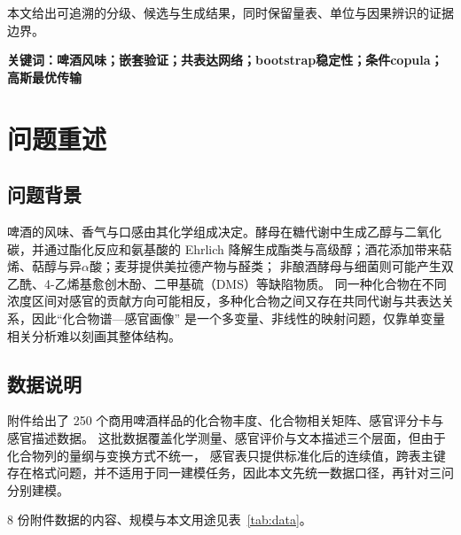 \documentclass[UTF8,a4paper,zihao=-4]{ctexart}
\numberwithin{figure}{section}
\numberwithin{table}{section}
\numberwithin{equation}{section}
\begin{document}
本文给出可追溯的分级、候选与生成结果，同时保留量表、单位与因果辨识的证据边界。

\vspace{0.3em}
\noindent\textbf{关键词：啤酒风味；嵌套验证；共表达网络；bootstrap稳定性；条件copula；高斯最优传输}
\newpage
\pagestyle{empty}
\tableofcontents  


\newpage
\pagestyle{fancy}
\setcounter{page}{1}

\section{问题重述}
\label{sec:problem}

\subsection{问题背景}

啤酒的风味、香气与口感由其化学组成决定\cite{liu2023}。酵母在糖代谢中生成乙醇与二氧化碳，并通过酯化反应和氨基酸的 
Ehrlich 降解生成酯类与高级醇；酒花添加带来萜烯、萜醇与异$\alpha$酸\cite{lijj2025}；麦芽提供美拉德产物与醛类；
非酿酒酵母与细菌则可能产生双乙酰、4-乙烯基愈创木酚、二甲基硫（DMS）等缺陷物质\cite{vanderhaegen2006}。
同一种化合物在不同浓度区间对感官的贡献方向可能相反，多种化合物之间又存在共同代谢与共表达关系，因此“化合物谱—感官画像”
是一个多变量、非线性的映射问题，仅靠单变量相关分析难以刻画其整体结构。



\subsection{数据说明}
附件给出了 250 个商用啤酒样品\cite{schreurs2024}的化合物丰度、化合物相关矩阵、感官评分卡与感官描述数据。
这批数据覆盖化学测量、感官评价与文本描述三个层面，但由于化合物列的量纲与变换方式不统一，
感官表只提供标准化后的连续值，跨表主键存在格式问题，并不适用于同一建模任务，因此本文先统一数据口径，再针对三问分别建模。

8 份附件数据的内容、规模与本文用途见表~\ref{tab:data}。
\end{document}
